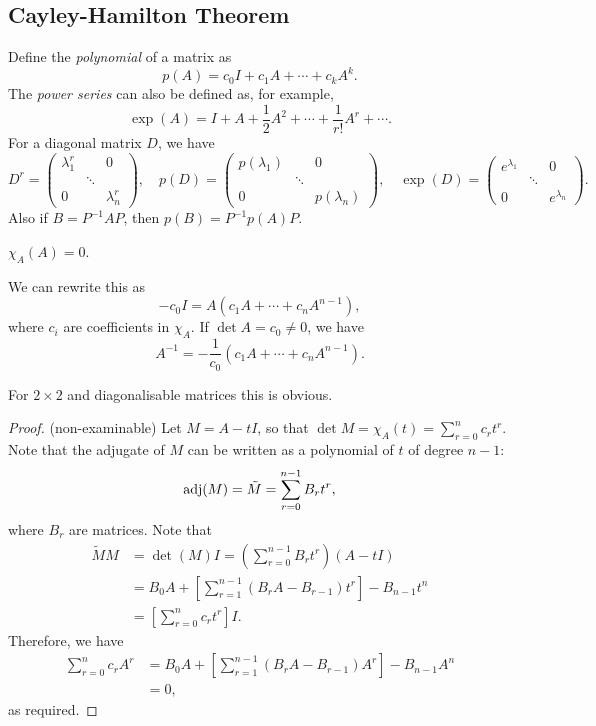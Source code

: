 \documentclass[a4paper]{article}
\begin{document}
    \subsection{Cayley-Hamilton Theorem}
    Define the \textit{polynomial} of a matrix as
    \[
      p(A)=c_0I+c_1A+\cdots + c_kA^k.
    \]
    The \textit{power series} can also be defined as, for example,
    \[
      \exp(A)=I+A+\frac{1}{2}A^2+ \cdots +\frac{1}{r!}A^r+ \cdots .
    \]
    For a diagonal matrix $D$, we have
    \[
      D^r =
      \begin{pmatrix}
        \lambda_1^r&&0\\
        & \ddots &\\
        0&&\lambda_n^r
      \end{pmatrix},\quad p(D)=
      \begin{pmatrix}
        p(\lambda_1)&&0\\
        & \ddots &\\
        0&&p(\lambda_n)
      \end{pmatrix}, \quad \exp(D)=
      \begin{pmatrix}
        e^{\lambda_1}&&0\\
        & \ddots &\\
        0&&e^{\lambda_n}
      \end{pmatrix}.
    \]
    Also if $ B=P^{-1}AP $, then $ p(B)=P^{-1}p(A)P $.
    \begin{theorem}\label{thm:Cayley-Hamilton}
      $ \chi_A(A)=0 $.
    \end{theorem}
    \begin{remark}
      We can rewrite this as
      \[
        -c_0I = A(c_1A+ \cdots +c_nA^{n-1}),
      \]
      where $c_i$ are coefficients in $\chi_A$. If $ \det A=c_0\neq 0 $, we have
      \[
        A^{-1}=-\frac{1}{c_0}(c_1A+ \cdots +c_nA^{n-1}).
      \]
    \end{remark}
    For $ 2 \times 2 $ and diagonalisable matrices this is obvious.
    \begin{proof}(non-examinable)
      Let $ M=A-tI $, so that $ \det M=\chi_A(t)=\sum_{r=0}^{n}c_rt^r
      $. Note that the adjugate of $M$ can be written as a polynomial
      of $t$ of degree $n-1$:
      \[
        \operatorname{adj}(M)=\tilde{M}=\sum_{r=0}^{n-1}B_r t^r,
      \]
      where $B_r$ are matrices. Note that
      \begin{align*}
        \tilde{M}M&=\det (M)I = \left( \sum_{r=0}^{n-1}B_r t^r
        \right)\left( A-tI \right)\\
        &=B_0A+ \left[\sum_{r=1}^{n-1}(B_{r}A-B_{r-1})t^r\right] -B_{n-1}t^n\\
        &= \left[ \sum_{r=0}^{n}c_rt^r  \right]I.
      \end{align*}
      Therefore, we have
      \begin{align*}
        \sum_{r=0}^{n}c_r A^r&= B_0A+
        \left[\sum_{r=1}^{n-1}(B_{r}A-B_{r-1})A^r\right] -B_{n-1}A^n\\
        &= 0,
      \end{align*}
      as required.
    \end{proof}
\end{document}
